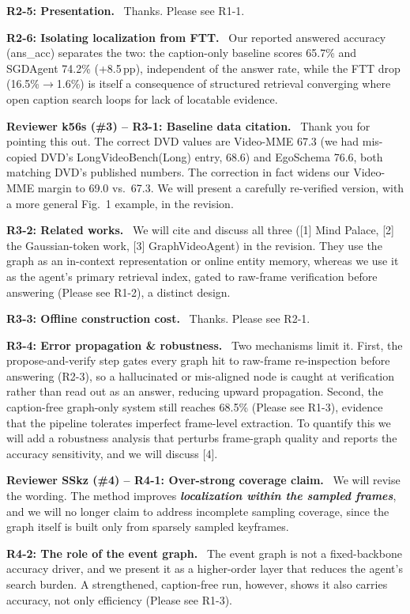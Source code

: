 \documentclass[10pt,twocolumn]{article}
\newcommand{\rvcolor}{rvR1}
\newcommand{\pt}[1]{\textbf{\textcolor{\rvcolor}{#1}}\ }
\newcommand{\rv}[1]{\vspace{1.5pt}\pt{#1}}
\renewcommand{\emph}[1]{\textbf{\textit{#1}}}
\begin{document}
\pt{R2-5: Presentation.} Thanks. Please see R1-1.

\pt{R2-6: Isolating localization from FTT.} Our reported answered accuracy
(ans\_acc) separates the two: the caption-only baseline scores 65.7\% and
SGDAgent 74.2\% (+8.5\,pp), independent of the answer rate, while the FTT drop
(16.5\%$\to$1.6\%) is itself a consequence of structured retrieval converging
where open caption search loops for lack of locatable evidence.

\renewcommand{\rvcolor}{rvR3}%
\rv{Reviewer k56s (\#3) -- R3-1: Baseline data citation.} Thank you for pointing
this out. The correct DVD values are Video-MME 67.3 (we had mis-copied DVD's
LongVideoBench(Long) entry, 68.6) and EgoSchema 76.6, both matching DVD's
published numbers. The correction in fact
widens our Video-MME margin to 69.0 vs.\ 67.3. We will present a carefully re-verified version, with a more
general Fig.~1 example, in the revision.

\pt{R3-2: Related works.} We will cite and discuss all three ([1] Mind
Palace, [2] the Gaussian-token work, [3] GraphVideoAgent) in the revision.
They use the graph as an in-context representation or online entity memory,
whereas we use it as the agent's primary retrieval index, gated to raw-frame
verification before answering (Please see R1-2), a distinct design.

\pt{R3-3: Offline construction cost.} Thanks. Please see R2-1.

\pt{R3-4: Error propagation \& robustness.} Two mechanisms limit it. First,
the propose-and-verify step gates every graph hit to raw-frame re-inspection before answering
(R2-3), so a hallucinated or mis-aligned node is caught at verification rather
than read out as an answer, reducing upward propagation. Second, the caption-free
graph-only system still reaches 68.5\% (Please see R1-3), evidence that the pipeline
tolerates imperfect frame-level extraction. To quantify this we will add a
robustness analysis that perturbs frame-graph quality and reports the accuracy
sensitivity, and we will discuss [4].

\renewcommand{\rvcolor}{rvR4}%
\rv{Reviewer SSkz (\#4) -- R4-1: Over-strong coverage claim.} We will revise
the wording. The method improves \emph{localization within the sampled frames}, and
we will no longer claim to address incomplete sampling coverage, since the graph
itself is built only from sparsely sampled keyframes.

\pt{R4-2: The role of the event graph.} The event graph is
not a fixed-backbone accuracy driver, and we present it as a higher-order layer
that reduces the agent's search burden. A strengthened, caption-free run, however,
shows it also carries accuracy, not only efficiency (Please see R1-3).
\end{document}
